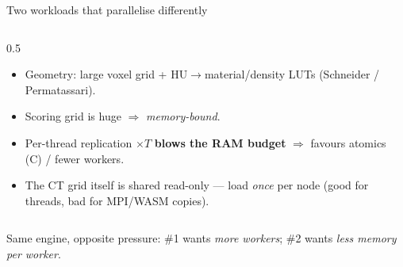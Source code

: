 \documentclass[aspectratio=169,10pt]{beamer}
\newcommand{\code}[1]{{\ttfamily\footnotesize #1}}
\begin{document}
\begin{frame}{Two workloads that parallelise differently}
\begin{columns}[T]
\begin{column}{0.5\textwidth}
      \begin{itemize}\scriptsize\itemsep1pt
        \item Geometry: large voxel grid + HU$\to$material/density LUTs
              (Schneider / Permatassari).
        \item Scoring grid is huge $\Rightarrow$ \emph{memory-bound}.
        \item Per-thread replication $\times T$ \textbf{blows the RAM budget}
              $\Rightarrow$ favours atomics (C) / fewer workers.
        \item The CT grid itself is \textcolor{oshGreen}{shared read-only} —
              load \emph{once} per node (good for threads, bad for MPI/WASM copies).
      \end{itemize}
      \footnotesize\color{oshGrey}\code{src/voxel/README.md}
    \end{column}
  \end{columns}
  \vspace{0.5mm}
  \centering\footnotesize\color{oshBlue}
  Same engine, opposite pressure: \#1 wants \emph{more workers}; \#2 wants
  \emph{less memory per worker}.
\end{frame}
\end{document}
